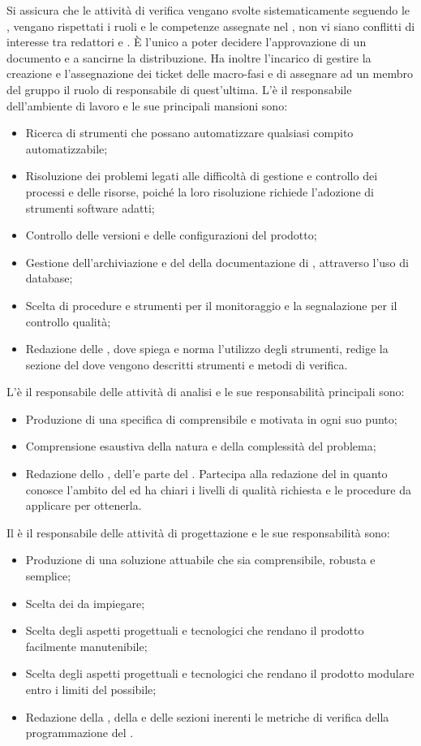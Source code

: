 Si assicura che le attività di verifica vengano svolte sistematicamente seguendo le \NP, vengano rispettati i ruoli e le competenze assegnate nel \PP, non vi siano conflitti di interesse tra redattori e \rVs. \`E l'unico a poter decidere l'approvazione di un documento e a sancirne la distribuzione.
Ha inoltre l'incarico di gestire la creazione e l'assegnazione dei ticket delle macro-fasi e di assegnare ad un membro del gruppo il ruolo di responsabile di quest'ultima.
\subsubsubsubsection{\rAP}
L'\rAP è il responsabile dell'ambiente di lavoro e le sue principali mansioni sono:
\begin{itemize}
\item Ricerca di strumenti che possano automatizzare qualsiasi compito automatizzabile;
\item Risoluzione dei problemi legati alle difficoltà di gestione e controllo dei processi e delle risorse, poiché la loro risoluzione richiede l'adozione di strumenti software adatti;
\item Controllo delle versioni e delle configurazioni del prodotto;
\item Gestione dell'archiviazione e del  della documentazione di , attraverso l'uso di database;
\item Scelta di procedure e strumenti per il monitoraggio e la segnalazione per il controllo qualità;
\item Redazione delle \NP, dove spiega e norma l'utilizzo degli strumenti, redige la sezione del \PQ dove vengono descritti strumenti e metodi di verifica.
\end{itemize}
\subsubsubsubsection{\rA}
L’\rA è il responsabile delle attività di analisi e le sue responsabilità principali sono:
\begin{itemize}
\item Produzione di una specifica di  comprensibile e motivata in ogni suo punto;
\item Comprensione esaustiva della natura e della complessità del problema;
\item Redazione dello \SF, dell'\AR e parte del \PQ. Partecipa alla redazione del \PQ in quanto conosce l'ambito del  ed ha chiari i livelli di qualità richiesta e le procedure da applicare per ottenerla.
\end{itemize}
\subsubsubsubsection{\rP}
Il \rP è il responsabile delle attività di progettazione e le sue responsabilità sono:
\begin{itemize}
\item Produzione di una soluzione attuabile che sia comprensibile, robusta e semplice;
\item Scelta dei  da impiegare;
\item Scelta degli aspetti progettuali e tecnologici che rendano il prodotto facilmente manutenibile;
\item Scelta degli aspetti progettuali e tecnologici che rendano il prodotto modulare entro i limiti del possibile;
\item Redazione della \ST, della \DP e delle sezioni inerenti le metriche di verifica della programmazione del \PQ.
\end{itemize}
